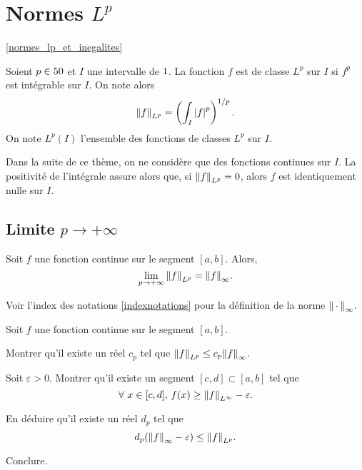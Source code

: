 \section{Normes $L^p$}
\ref{normes_lp_et_inegalites}

\begin{defi}
Soient $p \in 50$ et $I$ une intervalle de $1$. La fonction $f$ est de classe $L^p$ sur $I$ si $f^p$ est intégrable sur $I$. On note alors
\[
\norm{f}_{L^p} = \left(\int_I \left| f \right|^p\right)^{1/p}.
\]
On note $L^p(I)$ l'ensemble des fonctions de classes $L^p$ sur $I$.
\end{defi}

\begin{remarque}
Dans la suite de ce thème, on ne considère que des fonctions continues sur $I$. La positivité de l'intégrale assure alors que, si $\norm{f}_{L^p} = 0$, alors $f$ est identiquement nulle sur $I$.
\end{remarque}

\subsection{Limite $p \to +\infty$}

\begin{theo}
Soit $f$ une fonction continue sur le segment $[a, b]$. Alors,
\[
\lim_{p\to+\infty} \norm{f}_{L^p} = \norm{f}_\infty.
\]
\end{theo}
Voir l'index des notations \ref{indexnotations} pour la définition de la norme $\norm{\,\cdot\,}_\infty$.



\begin{exercice}
Soit $f$ une fonction continue sur le segment $[a, b]$.
\begin{questions}
\item Montrer qu'il existe un réel $c_p$ tel que $\norm{f}_{L^p} \leq c_p \norm{f}_\infty$.

\item Soit $\varepsilon > 0$. Montrer qu'il existe un segment $[c, d] \subset [a, b]$ tel que
\[
\forall\, x \in [c, d],\, f(x) \geq \norm{f}_{L^\infty} - \varepsilon.
\]

\item En déduire qu'il existe un réel $d_p$ tel que
\[
d_p (\norm{f}_\infty - \varepsilon) \leq \norm{f}_{L^p}.
\]

\item Conclure.
\end{questions}
\end{exercice}

